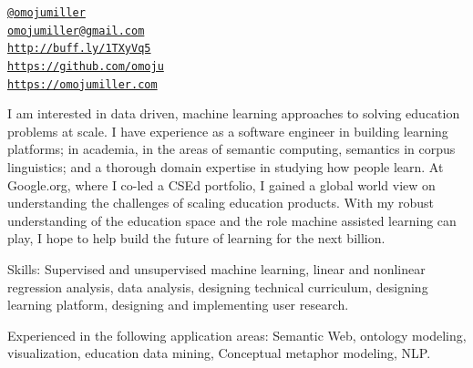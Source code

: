 \documentclass[11pt,article,oneside]{memoir}
\makeatletter
\def\myemail{omojumiller@gmail.com}
\def\myweb{https://omojumiller.com}
\def\mytwitter{@omojumiller}
\def\mylinkedin{http://buff.ly/1TXyVq5}
\def\mygithub{https://github.com/omoju}
\makeatother
\begin{document}
\begin{minipage}[t]{2.95in}
  
\end{minipage}
\hfill     
\hfill
\begin{minipage}[t]{1.3in}
  \flushright \footnotesize  \addressblock 
  {\scriptsize  \texttt{\href{http://twitter.com/omojumiller}{\mytwitter}} \, \faTwitter }  \\ 
  {\scriptsize  \texttt{\href{mailto:\myemail}{\myemail}} \, \faEnvelope} \\
  {\scriptsize  \texttt{\href{\mylinkedin}{\mylinkedin}} \, \faLinkedin} \\
  {\scriptsize  \texttt{\href{\mygithub}{\mygithub}} \, \faGithub} \\
  {\scriptsize  \texttt{\href{\myweb}{\myweb}} \, \faGlobe}
\end{minipage}

\medskip

\reversemarginpar

\bigskip       


\medskip

\ind I am interested in data driven, machine learning approaches to solving education problems at scale. I have experience as a software engineer in building learning platforms;  in academia, in the areas of semantic computing, semantics in corpus linguistics;  and a thorough domain expertise in studying how people learn. At Google.org, where I co-led a CSEd portfolio, I gained a global world view on understanding the challenges of scaling education products. With my robust understanding of the education space and the role machine assisted learning can play, I hope to help build the future of learning for the next billion.

\ind Skills:
Supervised and unsupervised machine learning, linear and nonlinear regression analysis, data analysis, designing technical curriculum, designing learning platform, designing and implementing user research.

\ind Experienced in the following application areas:
Semantic Web, ontology modeling, visualization, education data mining, Conceptual metaphor modeling, NLP.
\end{document}
